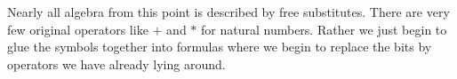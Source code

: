 Nearly all algebra from this point is described by free substitutes.
There are very few original operators like $+$ and $*$ for natural numbers.
Rather we just begin to glue the symbols together into formulas where we 
begin to replace the bits by operators we have already lying around.